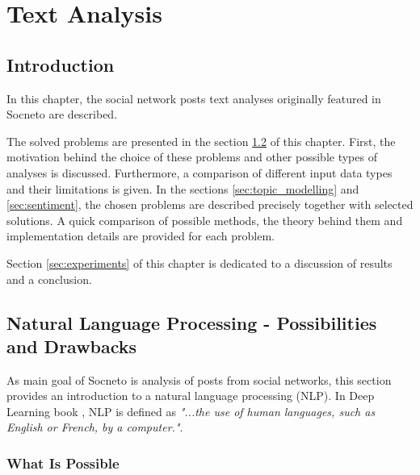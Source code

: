 \chapter{Text Analysis}\label{chapter:analysis}

\section{Introduction}
In this chapter, the social network posts text analyses originally featured in Socneto are described. 

The solved problems are presented in the section \ref{sec:posibilities} of this chapter. First, the motivation behind the choice of these problems and other possible types of analyses is discussed. Furthermore, a comparison of different input data types and their limitations is given. 
In the sections \ref{sec:topic_modelling} and \ref{sec:sentiment}, the chosen problems are described precisely together with selected solutions. A quick comparison of possible methods, the theory behind them and implementation details are provided for each problem.

Section \ref{sec:experiments} of this chapter is dedicated to a discussion of results and a conclusion.

\section{Natural Language Processing - Possibilities and Drawbacks}
\label{sec:posibilities}

As main goal of Socneto is analysis of posts from social networks, this section provides an introduction to a natural language processing (NLP). In Deep Learning book \cite{DeeplearningBook}, NLP is defined as \textit{"...the use of human languages, such as English or French, by a computer."}.

\subsection{What Is Possible}

